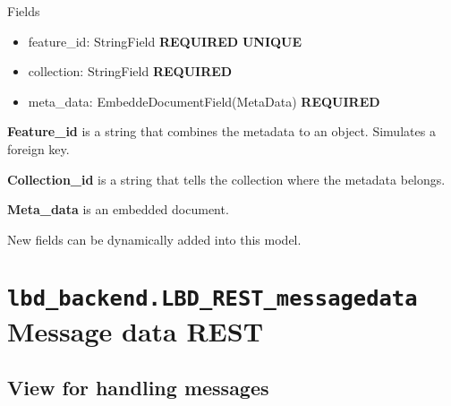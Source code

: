 \documentclass[letterpaper,10pt,english]{sphinxmanual}
\begin{document}
\begin{fulllineitems}
\label{codedoc/locdoc:lbd_backend.LBD_REST_locationdata.models.MetaDocument}
Fields
\begin{itemize}
\item {} 
feature\_id: StringField \textbf{REQUIRED} \textbf{UNIQUE}

\item {} 
collection: StringField \textbf{REQUIRED}

\item {} 
meta\_data: EmbeddeDocumentField(MetaData) \textbf{REQUIRED}

\end{itemize}

\textbf{Feature\_id} is a string that combines the metadata to an object. Simulates a foreign key.

\textbf{Collection\_id} is a string that tells the collection where the metadata belongs.

\textbf{Meta\_data} is an embedded document.

New fields can be dynamically added into this model.

\end{fulllineitems}



\section{\texttt{lbd\_backend.LBD\_REST\_messagedata} Message data REST}
\label{codedoc/msgdoc:module-lbd_backend.LBD_REST_messagedata.views}\label{codedoc/msgdoc::doc}\label{codedoc/msgdoc:lbd-backend-lbd-rest-messagedata-message-data-rest}

\subsection{View for handling messages}
\label{codedoc/msgdoc:module-MessagedataREST.views}\label{codedoc/msgdoc:view-for-handling-messages}
\end{document}
